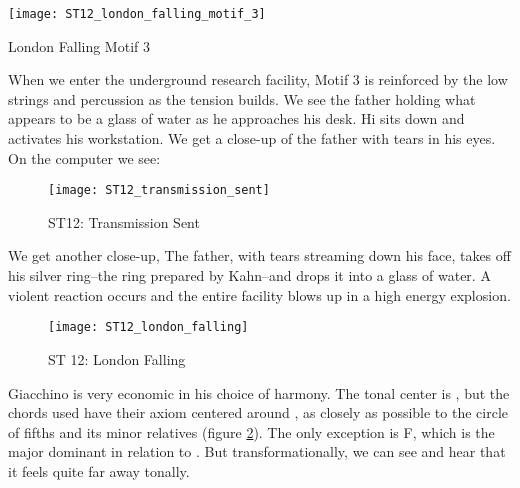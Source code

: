 \begin{marginfigure}
\texttt{[image: ST12\_london\_falling\_motif\_3]}
	\caption{London Falling Motif 3}
	\label{ST12_london_falling_motif_3}
\end{marginfigure}

When we enter the underground research facility, Motif 3 is reinforced by the low strings and percussion as the tension builds. We see the father holding what appears to be a glass of water as he approaches his desk. Hi sits down and activates his workstation. We get a close-up of the father with tears in his eyes. On the computer we see:

\begin{figure}[h!]
\center
\texttt{[image: ST12\_transmission\_sent]}
	\caption{ST12: Transmission Sent}
	\label{ST12_transmission_sent}
\end{figure}

\noindent We get another close-up, The father, with tears streaming down his face, takes off his silver ring--the ring prepared by Kahn--and drops it into a glass of water. A violent reaction occurs and the entire facility blows up in a high energy explosion.

\begin{figure}
\center
\texttt{[image: ST12\_london\_falling]}
	\caption{ST 12: London Falling}
	\label{ST12_london_falling}
\end{figure}

Giacchino is very economic in his choice of harmony. The tonal center is \bflatm, but the chords used have their axiom centered around \fiss, as closely as possible to the circle of fifths and its minor relatives (figure \ref{ST12_london_falling}). The only exception is F, which is the major dominant in relation to \bflatm. But transformationally, we can see and hear that it feels quite far away tonally. 

\clearpage


